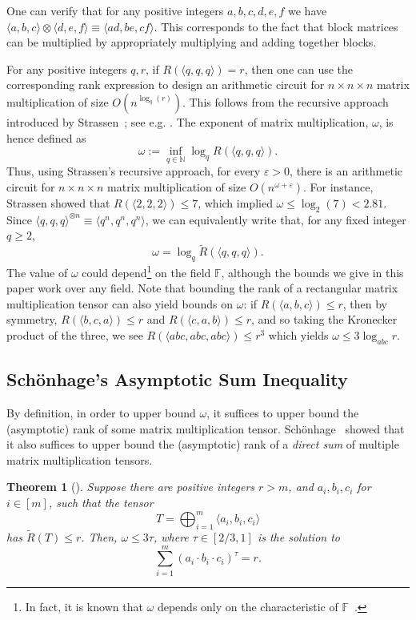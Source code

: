 \PassOptionsToPackage{shortlabels}{enumitem}\documentclass[10pt,a4paper]{article}
\newtheorem{theorem}{Theorem}[section]
\newcommand{\F}{\mathbb{F}}
\newcommand{\eps}{\varepsilon}
\begin{document}
One can verify that for any positive integers $a,b,c,d,e,f$ we have $\langle a,b,c \rangle \otimes \langle d,e,f \rangle \equiv \langle ad, be, cf \rangle$. This corresponds to the fact that block matrices can be multiplied by appropriately multiplying and adding together blocks.

For any positive integers $q,r$, if $R(\langle q,q,q \rangle) = r$, then one can use the corresponding rank expression to design an arithmetic circuit for $n \times n \times n$ matrix multiplication of size $O(n^{\log_q(r)})$. This follows from the recursive approach introduced by Strassen~\cite{strassen}; see e.g. \cite[Proposition~1.1, Theorem~5.2]{blaser}. The exponent of matrix multiplication, $\omega$, is hence defined as $$\omega := \inf_{q \in \mathbb{N}} \log_q R(\langle q,q,q \rangle).$$ Thus, using Strassen's recursive approach, for every $\eps>0$, there is an arithmetic circuit for $n \times n \times n$ matrix multiplication of size $O(n^{\omega + \eps})$. For instance, Strassen showed that $R(\langle 2,2,2 \rangle) \leq 7$, which implied $\omega \leq \log_2(7) < 2.81$. Since $\langle q,q,q \rangle^{\otimes n} \equiv \langle q^n,q^n,q^n \rangle$, we can equivalently write that, for any fixed integer $q \geq 2$, $$\omega = \log_q \tilde{R}(\langle q,q,q \rangle).$$
The value of $\omega$ could depend\footnote{In fact, it is known that $\omega$ depends only on the characteristic of $\F$~\cite{Sch81}.} on the field $\F$, although the bounds we give in this paper work over any field. Note that bounding the rank of a rectangular matrix multiplication tensor can also yield bounds on $\omega$: if $R(\langle a,b,c \rangle) \leq r$, then by symmetry, $R(\langle b,c,a \rangle) \leq r$ and $R(\langle c,a,b \rangle) \leq r$, and so taking the Kronecker product of the three, we see $R(\langle abc,abc,abc \rangle) \leq r^3$ which yields $\omega \leq 3 \log_{abc} r$.

\subsection{Sch{\"o}nhage's Asymptotic Sum Inequality}

By definition, in order to upper bound $\omega$, it suffices to upper bound the (asymptotic) rank of some matrix multiplication tensor. Sch{\"o}nhage~\cite{Sch81} showed that it also suffices to upper bound the (asymptotic) rank of a \emph{direct sum} of multiple matrix multiplication tensors.

\begin{theorem}[\cite{Sch81}]\label{thm:schonhage}
Suppose there are positive integers $r>m$, and $a_i,b_i,c_i$ for $i \in [m]$, such that the tensor $$T = \bigoplus_{i=1}^m \langle a_i,b_i,c_i \rangle$$ has $\tilde{R}(T) \leq r$. Then, $\omega \leq 3 \tau$, where $\tau \in [2/3,1]$ is the solution to $$\sum_{i=1}^m (a_i \cdot b_i \cdot c_i)^\tau = r.$$
\end{theorem}
\end{document}
